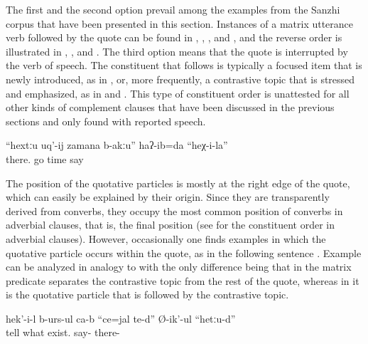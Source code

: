 The first and the second option prevail among the examples from the Sanzhi corpus that have been presented in this section. Instances of a matrix utterance verb followed by the quote can be found in , , , and , and the reverse order is illustrated in , , and . The third option means that the quote is interrupted by the verb of speech. The constituent that follows is typically a focused item that is newly introduced, as in , or, more frequently, a contrastive topic that is stressed and emphasized, as in  and . This type of constituent order is unattested for all other kinds of complement clauses that have been discussed in the previous sections and only found with reported speech.
%
\begin{exe}
	\ex	\label{ex:I said, He does not have the time to go there}
	\gll	``hextːu	uq'-ij	zamana	b-akːu''	haʔ-ib=da 	``heχ-i-la''\\
		there.	go	time		say	\\
	\glt	{}
\end{exe}

The position of the quotative particles is mostly at the right edge of the quote, which can easily be explained by their origin. Since they are transparently derived from converbs, they occupy the most common position of converbs in adverbial clauses, that is, the final position (see  for the constituent order in adverbial clauses). However, occasionally one finds examples in which the quotative particle occurs within the quote, as in the following sentence . Example  can be analyzed in analogy to  with the only difference being that in  the matrix predicate separates the contrastive topic from the rest of the quote, whereas in  it is the quotative particle that is followed by the contrastive topic.
%
\begin{exe}
	\ex	\label{ex:He is telling that there is something there}
	\gll	hek'-i-l	b-urs-ul	ca-b	``ce=jal	te-d''	Ø-ik'-ul	``hetːu-d''\\
			tell		what	exist.		say-	there-\\
	\glt	{}
\end{exe}


